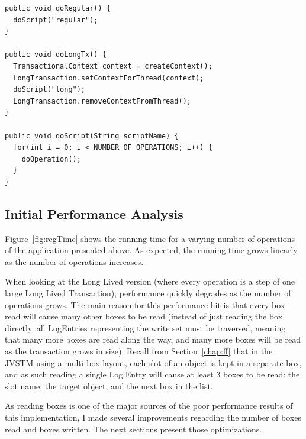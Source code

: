 \documentclass{llncs}
\begin{document}
\begin{lstlisting}[caption={Invoking the business operation},
 label={lst:invoc-diff},float]
public void doRegular() {
  doScript("regular");
}

public void doLongTx() {
  TransactionalContext context = createContext();
  LongTransaction.setContextForThread(context);
  doScript("long");
  LongTransaction.removeContextFromThread();
}

public void doScript(String scriptName) {
  for(int i = 0; i < NUMBER_OF_OPERATIONS; i++) {
    doOperation();
  }
}
\end{lstlisting}

\subsection{Initial Performance Analysis}

Figure~\ref{fig:regTime} shows the running time for a varying number
of operations of the application presented above. As expected, the
running time grows linearly as the number of operations increases.

When looking at the Long Lived version (where every operation is a
step of one large Long Lived Transaction), performance quickly
degrades as the number of operations grows. The main reason for this
performance hit is that every box read will cause many other boxes to
be read (instead of just reading the box directly, all LogEntries
representing the write set must be traversed, meaning that many more
boxes are read along the way, and many more boxes will be read as the
transaction grows in size). Recall from Section~\ref{chap:ff} that in
the JVSTM using a multi-box layout, each slot of an object is kept in
a separate box, and as such reading a single Log Entry will cause at
least 3 boxes to be read: the slot name, the target object, and the
next box in the list.

As reading boxes is one of the major sources of the poor performance
results of this implementation, I made several improvements regarding
the number of boxes read and boxes written. The next sections present
those optimizations.
\end{document}
